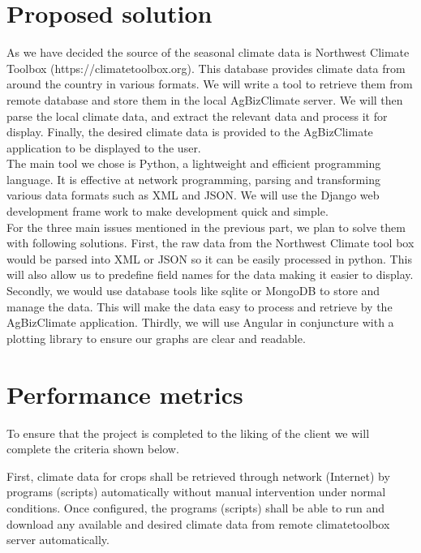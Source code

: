 \documentclass[letterpaper,10pt]{article}
\begin{document}
	  \section*{Proposed solution}
   As we have decided the source of the seasonal climate data is Northwest Climate Toolbox (https://climatetoolbox.org). This database provides climate data from around the country in various formats. We will write a tool to retrieve them from remote database and store them in the local AgBizClimate server. We will then  parse the local climate data, and extract the relevant data and process it for display. Finally, the desired climate data is provided to the AgBizClimate application to be displayed to the user.\\
   
   The main tool we chose is Python, a lightweight and efficient programming language. It is effective at network programming, parsing and transforming various data formats such as XML and JSON. We will use the Django web development frame work to make development quick and simple.\\
   
   For the three main issues mentioned in the previous part, we plan to solve them with following solutions. First, the raw data from the Northwest Climate tool box would be parsed into XML or JSON so it can be easily processed in python. This will also allow us to predefine field names for the data making it easier to display. Secondly, we would use database tools like sqlite or MongoDB to store and manage the data. This will make the data easy to process and retrieve by the AgBizClimate application. Thirdly, we will use Angular in conjuncture with a plotting library to ensure our graphs are clear and readable.\\
	
	  \section*{Performance metrics}
		To ensure that the project is completed to the liking of the client we will complete the criteria shown below.
    
    First, climate data for crops shall be retrieved through network (Internet) by programs (scripts) automatically without manual intervention under normal conditions. Once configured, the programs (scripts) shall be able to run and download any available and desired climate data from remote climatetoolbox server automatically.\\
    
\end{document}
